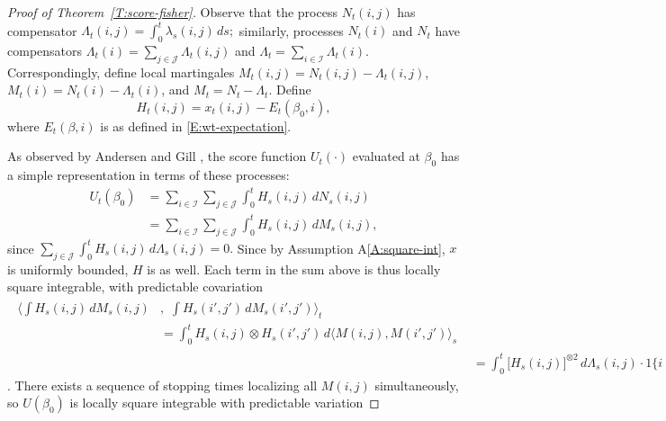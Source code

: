 \documentclass[aoas,preprint]{imsart}
\begin{document}
\begin{proof}[Proof of Theorem~\ref{T:score-fisher}]%
Observe that the process $N_t(i,j)$ has compensator
\(
    \Lambda_t(i,j)
        =
            \int_0^t \lambda_s(i,j) \, ds;
\)
similarly, processes $N_t(i)$ and $N_t$ have compensators
$\Lambda_t(i) = \sum_{j \in \mathcal{J}} \Lambda_t(i,j)$
and $\Lambda_t = \sum_{i \in \mathcal{I}} \Lambda_t(i)$.  Correspondingly, define local
martingales $M_t(i,j) = N_t(i,j) - \Lambda_t(i,j)$,
$M_t(i) = N_t(i) - \Lambda_t(i)$, and
$M_t = N_t - \Lambda_t$.
Define
\[
    H_t(i,j)
        =
        x_t(i,j) - E_t(\beta_0,i),
\]
where $E_t(\beta,i)$ is as defined in \eqref{E:wt-expectation}.

As observed by Andersen and Gill \cite{andersen1982cox}, the score function 
$U_t(\cdot)$ evaluated at $\beta_0$ has 
a simple representation in terms of these processes:
\begin{align*}
    U_t(\beta_0)
        &=
        \sum_{i \in \mathcal{I}}
        \sum_{j \in \mathcal{J}}
        \int_0^t
            H_s(i,j) \, dN_s(i,j) \\
        &=
        \sum_{i \in \mathcal{I}}
        \sum_{j \in \mathcal{J}}
        \int_0^t
            H_s(i,j) \, dM_s(i,j),
\end{align*}
since
\(
    \sum_{j \in \mathcal{J}}
    \int_0^t
        H_s(i,j) \,
        d\Lambda_s(i,j)
    =
    0.
\)
Since by Assumption A\ref{A:square-int}, $x$ is uniformly bounded, $H$ is as well.  Each term in the sum above is thus locally square integrable, with predictable covariation
\begin{align*}
    \begin{split}
        \bigg\langle
            \int
                H_s(i,j) \, dM_s(i,j)
        &, \, \,
            \int
                H_s(i',j') \, dM_s(i',j')
        \bigg\rangle_t \\
        &=
            \int_0^t
                H_s(i,j) \otimes H_s(i',j') \,
                d\big\langle M(i,j), M(i',j')\big\rangle_s
    \end{split} \\
        &=
            \int_0^t
                \big[ H_s(i,j) \big]^{\otimes 2} \,
                d\Lambda_s(i,j)
            \cdot
            1\{ i = i', j = j' \}
\end{align*}
\cite[Thm.~2.4.3]{fleming1991counting}.  There exists a sequence
of stopping times localizing all $M(i,j)$ simultaneously, so $U(\beta_0)$ is
locally square integrable with predictable variation

\end{proof}
\end{document}
